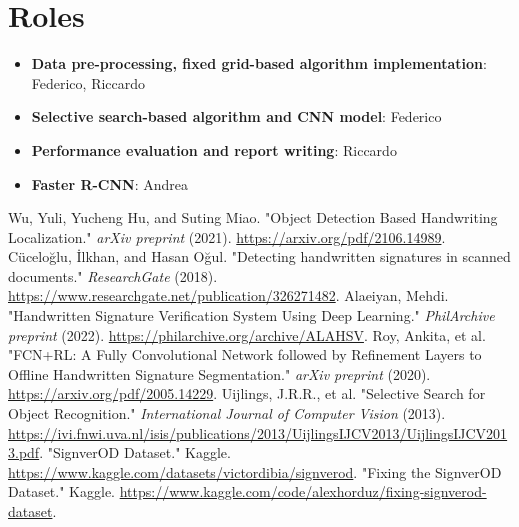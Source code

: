 \documentclass[a4paper,12pt]{article}
\begin{document}
\section{Roles}
\begin{itemize}
    \item \textbf{Data pre-processing, fixed grid-based algorithm implementation}: Federico, Riccardo
    \item \textbf{Selective search-based algorithm and CNN model}: Federico
    \item \textbf{Performance evaluation and report writing}: Riccardo
    \item \textbf{Faster R-CNN}: Andrea
\end{itemize}

\begin{thebibliography}{9}
 Wu, Yuli, Yucheng Hu, and Suting Miao. "Object Detection Based Handwriting Localization." \textit{arXiv preprint} (2021). \url{https://arxiv.org/pdf/2106.14989}.
 Cüceloğlu, İlkhan, and Hasan Oğul. "Detecting handwritten signatures in scanned documents." \textit{ResearchGate} (2018). \url{https://www.researchgate.net/publication/326271482}.
 Alaeiyan, Mehdi. "Handwritten Signature Verification System Using Deep Learning." \textit{PhilArchive preprint} (2022). \url{https://philarchive.org/archive/ALAHSV}.
 Roy, Ankita, et al. "FCN+RL: A Fully Convolutional Network followed by Refinement Layers to Offline Handwritten Signature Segmentation." \textit{arXiv preprint} (2020). \url{https://arxiv.org/pdf/2005.14229}.
 Uijlings, J.R.R., et al. "Selective Search for Object Recognition." \textit{International Journal of Computer Vision} (2013). \url{https://ivi.fnwi.uva.nl/isis/publications/2013/UijlingsIJCV2013/UijlingsIJCV2013.pdf}.
 "SignverOD Dataset." Kaggle. \url{https://www.kaggle.com/datasets/victordibia/signverod}.
 "Fixing the SignverOD Dataset." Kaggle. \url{https://www.kaggle.com/code/alexhorduz/fixing-signverod-dataset}.
\end{thebibliography}
\end{document}
